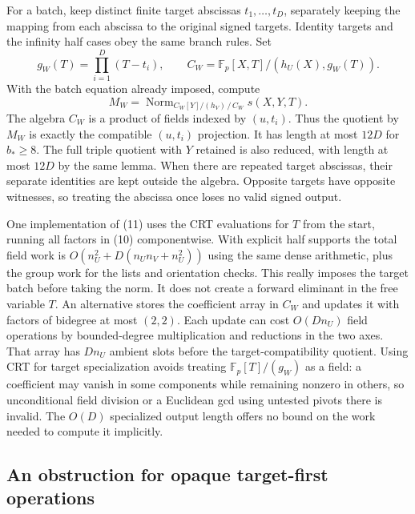\documentclass[11pt]{article}
\newcommand{\Fp}{\mathbb F_p}
\begin{document}
For a batch, keep distinct finite target abscissas \(t_1,\ldots,t_D\), separately keeping the mapping from each abscissa to the original signed targets. Identity targets and the infinity half cases obey the same branch rules. Set
\[
 g_W(T)=\prod_{i=1}^{D}(T-t_i),\qquad
 C_W=\Fp[X,T]/(h_U(X),g_W(T)).
\]
With the batch equation already imposed, compute
\[
 M_W=\operatorname{Norm}_{C_W[Y]/(h_V)\,/\,C_W} s(X,Y,T).
\tag{11}
\]
The algebra \(C_W\) is a product of fields indexed by \((u,t_i)\). Thus the quotient by \(M_W\) is exactly the compatible \((u,t_i)\) projection. It has length at most \(12D\) for \(b_*\ge8\). The full triple quotient with \(Y\) retained is also reduced, with length at most \(12D\) by the same lemma. When there are repeated target abscissas, their separate identities are kept outside the algebra. Opposite targets have opposite witnesses, so treating the abscissa once loses no valid signed output.

One implementation of (11) uses the CRT evaluations for \(T\) from the start, running all factors in (10) componentwise. With explicit half supports the total field work is \(O(n_U^2+D(n_Un_V+n_U^2))\) using the same dense arithmetic, plus the group work for the lists and orientation checks. This really imposes the target batch before taking the norm. It does not create a forward eliminant in the free variable \(T\). An alternative stores the coefficient array in \(C_W\) and updates it with factors of bidegree at most \((2,2)\). Each update can cost \(O(Dn_U)\) field operations by bounded-degree multiplication and reductions in the two axes. That array has \(Dn_U\) ambient slots before the target-compatibility quotient. Using CRT for target specialization avoids treating \(\Fp[T]/(g_W)\) as a field: a coefficient may vanish in some components while remaining nonzero in others, so unconditional field division or a Euclidean gcd using untested pivots there is invalid. The \(O(D)\) specialized output length offers no bound on the work needed to compute it implicitly.

\subsection*{An obstruction for opaque target-first operations}
\end{document}
